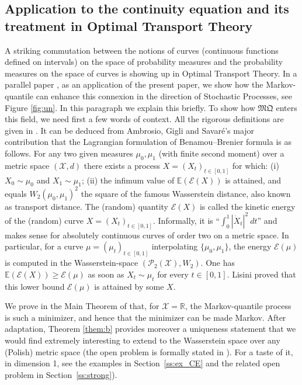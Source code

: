\documentclass[JEP,XML,SOM,Unicode,NoEqCountersInSection,NoFloatCountersInSection,published]{cedram}
\theoremstyle{plain}
\theoremstyle{definition}
\newcommand{\mq}{\mathfrak{MQ}}
\newcommand{\XX}{{\mathcal X}}
\newcommand{\EE}{{\mathcal E}}
\newcommand{\p}{\mathcal{P}}
\newcommand{\R}{\mathbb{R}}
\newcommand{\E}{\mathbb{E}}
\begin{document}
\subsection{Application to the continuity equation and its treatment in Optimal Transport Theory}\label{subsec:intro_transport}
A striking commutation between the notions of curves (continuous functions defined on intervals) on the space of probability measures and the probability measures on the space of curves is showing up in Optimal Transport Theory. In a parallel paper \cite{BouJui2}, as an application of the present paper, we show how the Markov-quantile can enhance this connexion in the direction of Stochastic Processes, see Figure \ref{fig:un}. In this paragraph we explain this briefly. To show how $\mq$ enters this field, we need first a few words of context. All the rigorous definitions are given in \cite{BouJui2}. It can be deduced from Ambrosio, Gigli and Savaré's major contribution \cite{AGS} that the Lagrangian formulation of Benamou--Brenier formula \cite{BeBr} is as follows. For any two given measures $\mu_0, \mu_1$ (with finite second moment) over a metric space $(\XX,d)$ there exists a process $X=(X_t)_{t\in [0,1]}$ for which: (i) $X_0\sim \mu_0$ and $X_1\sim \mu_1$; (ii) the infimum value of $\E(\EE(X))$ is attained, and equals $W_2(\mu_0,\mu_1)^2$ the square of the famous Wasserstein distance, also known as transport distance. The (random) quantity $\EE(X)$ is called the kinetic energy of the (random) curve $X=(X_t)_{t\in [0,1]}$. Informally, it is ``$\int_0^1 |\dot X_t|^2\ dt$'' and makes sense for absolutely continuous curves of order two on a metric space. In particular, for a curve $\mu=(\mu_t)_{t\in [0,1]}$ interpolating $\{\mu_0,\mu_1\}$, the energy $\EE(\mu)$ is computed in the Wasserstein-space $(\p_2(\XX),W_2)$. One has $\E(\EE(X))\geq \EE(\mu)$ as soon as $X_t\sim \mu_t$ for every $t\in [0,1]$. Lisini proved \cite{Lis} that this lower bound $\EE(\mu)$ is attained by some $X$.

We prove in the Main Theorem of \cite{BouJui2} that, for $\XX=\R$, the Markov-quantile process is such a minimizer, and hence that the minimizer can be made Markov. After adaptation, Theorem \ref{them:b} provides moreover a uniqueness statement that we would find extremely interesting to extend to the Wasserstein space over any (Polish) metric space (the open problem is formally stated in \cite{BouJui2}). For a taste of it, in dimension 1, see the examples in Section~\ref{ss:ex_CE} and the related open problem in Section~\ref{ss:strong}).
\end{document}
